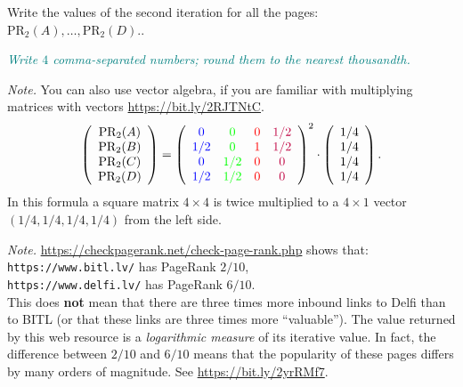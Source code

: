 \documentclass[jou]{apa6}
\begin{document}
Write the values of the second iteration for all the pages:
$\text{PR}_2(A),\ldots,\text{PR}_2(D).$.

\textcolor{teal}{\em Write $4$ comma-separated numbers; round them to 
the nearest thousandth.}





\vspace{4pt}
{\em Note.} You can also use vector algebra, if you are 
familiar with multiplying matrices with vectors
\textendash{} \url{https://bit.ly/2RJTNtC}.
$$\left( \begin{array}{c}
\text{PR}_2(A)\\
\text{PR}_2(B)\\
\text{PR}_2(C)\\
\text{PR}_2(D)
\end{array} \right) = \left( 
\begin{array}{cccc}
\textcolor{blue}{0}   & \textcolor{green}{0}   & \textcolor{red}{0} & \textcolor{purple}{1/2} \\
\textcolor{blue}{1/2} & \textcolor{green}{0}   & \textcolor{red}{1} & \textcolor{purple}{1/2} \\
\textcolor{blue}{0}   & \textcolor{green}{1/2} & \textcolor{red}{0} & \textcolor{purple}{0} \\
\textcolor{blue}{1/2} & \textcolor{green}{1/2} & \textcolor{red}{0} & \textcolor{purple}{0}
\end{array} \right)^2 \cdot \left( \begin{array}{c}
1/4 \\
1/4 \\
1/4 \\
1/4
\end{array} \right).$$
In this formula a square matrix $4 \times 4$ is twice multiplied to a $4 \times 1$
vector $(1/4, 1/4, 1/4, 1/4)$ from the left side. 


\vspace{4pt}
{\em Note.} \url{https://checkpagerank.net/check-page-rank.php}
shows that:\\
{\tt https://www.bitl.lv/} has PageRank $2/10$,\\
{\tt https://www.delfi.lv/} has PageRank $6/10$.\\
This does {\bf not} mean that there are three times more 
inbound links to Delfi than to BITL (or that these links are three times more ``valuable''). 
The value returned by this web resource is a {\em logarithmic measure}
of its iterative value. In fact, the difference between $2/10$ and $6/10$
means that the popularity of these pages differs by many orders of magnitude. 
See \url{https://bit.ly/2yrRMf7}.
\end{document}
